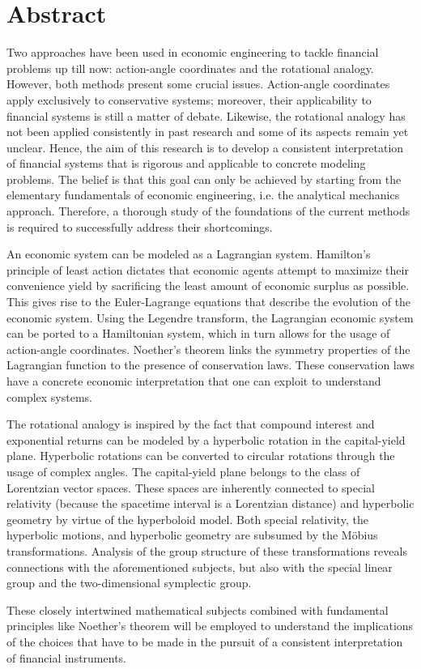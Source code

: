 \chapter*{Abstract}%
Two approaches have been used in economic engineering to tackle financial problems up till now: action-angle coordinates and the rotational analogy. However, both methods present some crucial issues. Action-angle coordinates apply exclusively to conservative systems; moreover, their applicability to financial systems is still a matter of debate. Likewise, the rotational analogy has not been applied consistently in past research and some of its aspects remain yet unclear. Hence, the aim of this research is to develop a consistent interpretation of financial systems that is rigorous and applicable to concrete modeling problems. The belief is that this goal can only be achieved by starting from the elementary fundamentals of economic engineering, i.e. the analytical mechanics approach. Therefore, a thorough study of the foundations of the current methods is required to successfully address their shortcomings.

An economic system can be modeled as a Lagrangian system. Hamilton's principle of least action dictates that economic agents attempt to maximize their convenience yield by sacrificing the least amount of economic surplus as possible. This gives rise to the Euler-Lagrange equations that describe the evolution of the economic system. Using the Legendre transform, the Lagrangian economic system can be ported to a Hamiltonian system, which in turn allows for the usage of action-angle coordinates. Noether's theorem links the symmetry properties of the Lagrangian function to the presence of conservation laws. These conservation laws have a concrete economic interpretation that one can exploit to understand complex systems.

The rotational analogy is inspired by the fact that compound interest and exponential returns can be modeled by a hyperbolic rotation in the capital-yield plane. Hyperbolic rotations can be converted to circular rotations through the usage of complex angles. The capital-yield plane belongs to the class of Lorentzian vector spaces. These spaces are inherently connected to special relativity (because the spacetime interval is a Lorentzian distance) and hyperbolic geometry by virtue of the hyperboloid model. Both special relativity, the hyperbolic motions, and hyperbolic geometry are subsumed by the Möbius transformations. Analysis of the group structure of these transformations reveals connections with the aforementioned subjects, but also with the special linear group and the two-dimensional symplectic group.

These closely intertwined mathematical subjects combined with fundamental principles like Noether's theorem will be employed to understand the implications of the choices that have to be made in the pursuit of a consistent interpretation of financial instruments.